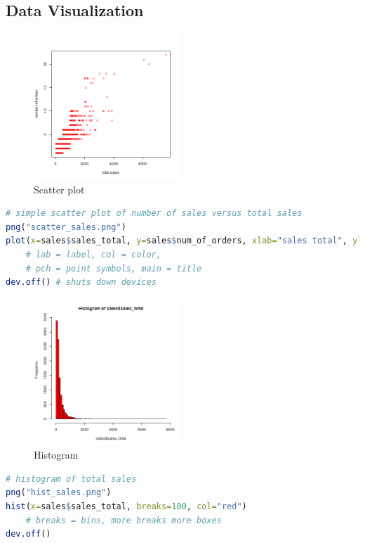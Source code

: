 \documentclass{article}
\begin{document}
\subsection{Data Visualization}
\begin{figure}[H]
    \centering
    \includegraphics[width=5.5cm]{images/scatter_sales.png}
    \caption{Scatter plot}
\end{figure}
\begin{lstlisting}[language = R]
# simple scatter plot of number of sales versus total sales
png("scatter_sales.png")
plot(x=sales$sales_total, y=sales$num_of_orders, xlab="sales total", ylab="number of orders", col="red", pch=1, main="Title") 
    # lab = label, col = color,
    # pch = point symbols, main = title
dev.off() # shuts down devices
\end{lstlisting}

\begin{figure}[ht]
    \centering
    \includegraphics[width=5.5cm]{images/hist2_sales.png}
    \caption{Histogram}
\end{figure}
\begin{lstlisting}[language = R]
# histogram of total sales
png("hist_sales.png")
hist(x=sales$sales_total, breaks=100, col="red")
    # breaks = bins, more breaks more boxes
dev.off()
\end{lstlisting}
\end{document}
